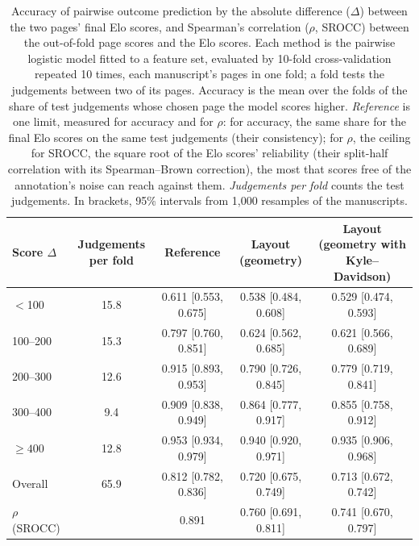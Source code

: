 \begin{table}[htbp]
  \centering
  \caption{Accuracy of pairwise outcome prediction by the absolute difference ($\Delta$) between the two pages' final Elo scores, and Spearman's correlation ($\rho$, SROCC) between the out-of-fold page scores and the Elo scores. Each method is the pairwise logistic model fitted to a feature set, evaluated by 10-fold cross-validation repeated 10 times, each manuscript's pages in one fold; a fold tests the judgements between two of its pages. Accuracy is the mean over the folds of the share of test judgements whose chosen page the model scores higher. \emph{Reference} is one limit, measured for accuracy and for $\rho$: for accuracy, the same share for the final Elo scores on the same test judgements (their consistency); for $\rho$, the ceiling for SROCC, the square root of the Elo scores' reliability (their split-half correlation with its Spearman--Brown correction), the most that scores free of the annotation's noise can reach against them. \emph{Judgements per fold} counts the test judgements. In brackets, 95\% intervals from 1,000 resamples of the manuscripts.}
  \label{tab:geometry_by_elo_gap}
  \begin{tabular}{lcccc}
    \toprule
    Score $\Delta$ & Judgements per fold & Reference & Layout (geometry) & Layout (geometry with Kyle--Davidson) \\
    \midrule
    $<$100 & 15.8 & 0.611 [0.553, 0.675] & 0.538 [0.484, 0.608] & 0.529 [0.474, 0.593] \\
    100--200 & 15.3 & 0.797 [0.760, 0.851] & 0.624 [0.562, 0.685] & 0.621 [0.566, 0.689] \\
    200--300 & 12.6 & 0.915 [0.893, 0.953] & 0.790 [0.726, 0.845] & 0.779 [0.719, 0.841] \\
    300--400 & 9.4 & 0.909 [0.838, 0.949] & 0.864 [0.777, 0.917] & 0.855 [0.758, 0.912] \\
    $\geq 400$ & 12.8 & 0.953 [0.934, 0.979] & 0.940 [0.920, 0.971] & 0.935 [0.906, 0.968] \\
    \midrule
    Overall & 65.9 & 0.812 [0.782, 0.836] & 0.720 [0.675, 0.749] & 0.713 [0.672, 0.742] \\
    \midrule
    $\rho$ (SROCC) &  & 0.891 & 0.760 [0.691, 0.811] & 0.741 [0.670, 0.797] \\
    \bottomrule
  \end{tabular}
\end{table}
